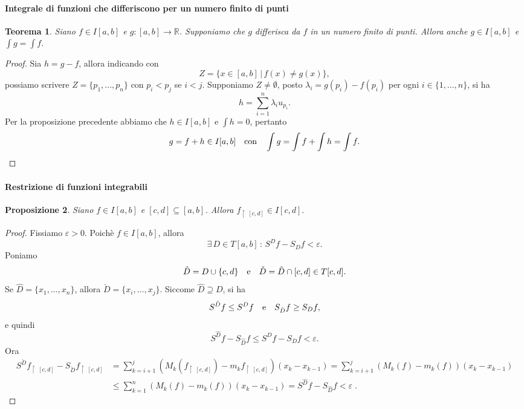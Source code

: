 \documentclass{article}
\theoremstyle{plain}
\newtheorem{thm}{Teorema}[section]
\newtheorem{prop}[thm]{Proposizione}
\theoremstyle{definition}
\theoremstyle{remark}
\begin{document}
\vspace{10pt}

\paragraph{Integrale di funzioni che differiscono per un numero finito di punti}
\begin{bxthm}
\begin{thm}\label{diecicinque}
    Siano $f\in I[a,b]$ e $g:[a,b]\to\mathbb{R}$.
    Supponiamo che $g$ differisca da $f$ in un numero finito di punti. 
    Allora anche $g\in I[a,b]$ e \(\int g=\int f.\)
\end{thm}
\end{bxthm}
\begin{proof}
    Sia $h=g-f$, allora indicando con \[Z=\{x\in[a,b]\,|\,f(x)\neq g(x)\},\]
    possiamo scrivere $Z=\{p_1,...,p_n\}$ con $p_i<p_j$ se $i<j$.
    Supponiamo $Z\neq\emptyset$, posto $\lambda_i=g(p_i)-f(p_i)$ per ogni $i\in\{1,...,n\}$, 
    si ha \[h=\sum_{i=1}^{n}\lambda_iu_{p_i}.\]
    Per la proposizione precedente abbiamo che $h\in I[a,b]$ e $\int h=0$, 
    pertanto \[g=f+h\in I[a,b]\quad\textup{con}\quad \int g=\int f+\int h=\int f.\]
\end{proof}

\vspace{10pt}

\paragraph{Restrizione di funzioni integrabili}
\begin{bxthm}
\begin{prop}\label{quellaseg}
    Siano $f\in I[a,b]$ e $[c,d]\subseteq[a,b]$.
    Allora \(f_{\upharpoonright \  [c,d]}\in I[c,d].\)
\end{prop}
\end{bxthm}
\begin{proof}
    Fissiamo $\varepsilon>0$. 
    Poichè $f\in I[a,b]$, allora \[\exists\,D\in T[a,b]\,:\,S^Df-S_Df < \varepsilon.\]
    Poniamo 
    \[\hat{D}=D\cup\{c,d\}\quad\textup{e}\quad\check{D}=\hat{D}\cap[c,d]\in T[c,d].\]
    Se $\hat{D}=\{x_1,\dots,x_n\}$, allora $\check{D}=\{x_i,\dots,x_j\}$.
    Siccome $\hat{D} \supseteq D$, si ha 
    \[S^{\hat{D}}f \leq S^{D}f\quad\textup{e}\quad S_{\hat{D}}f \geq S_{D}f,\]
    e quindi 
    \[S^{\hat{D}}f - S_{\hat{D}}f \leq S^{D}f - S_{D}f < \varepsilon.\]
    Ora 
    \begin{align*}
        S^{\check{D}}f_{\upharpoonright \  [c,d]} - S_{\check{D}}f_{\upharpoonright \  [c,d]} &= \sum_{k=i+1}^{j}(M_k(f_{\upharpoonright \  [c,d]}) - m_kf_{\upharpoonright \  [c,d]})(x_k - x_{k-1})= \sum_{k=i+1}^{j}(M_k(f) - m_k(f))(x_k - x_{k-1}) \\
        &\leq \sum_{k=1}^{n}(M_k(f) - m_k(f))(x_k - x_{k-1}) = S^{\hat{D}}f - S_{\hat{D}}f < \varepsilon\;.
    \end{align*}    
\end{proof}
\end{document}
